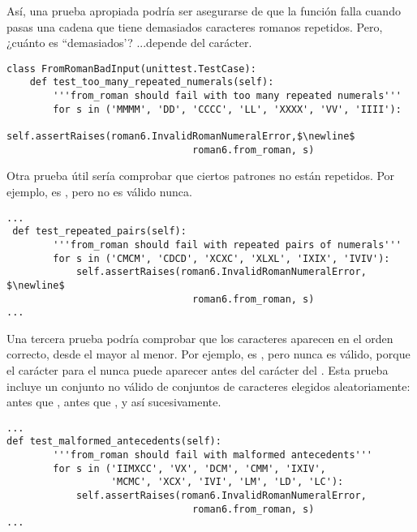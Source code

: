 Así, una prueba apropiada podría ser asegurarse de que la función  falla cuando pasas una cadena que tiene demasiados caracteres romanos repetidos. Pero, ¿cuánto es ``demasiados'? ...depende del carácter.

\noindent\begin{minipage}{\textwidth}
\begin{lstlisting}[mathescape=True]
class FromRomanBadInput(unittest.TestCase):
    def test_too_many_repeated_numerals(self):
        '''from_roman should fail with too many repeated numerals'''
        for s in ('MMMM', 'DD', 'CCCC', 'LL', 'XXXX', 'VV', 'IIII'):
            self.assertRaises(roman6.InvalidRomanNumeralError,$\newline$ 
                                roman6.from_roman, s)
\end{lstlisting}
\end{minipage}

Otra prueba útil sería comprobar que ciertos patrones no están repetidos. Por ejemplo,  es , pero  no es válido nunca.

\noindent\begin{minipage}{\textwidth}
\begin{lstlisting}[mathescape=True]
...
 def test_repeated_pairs(self):
        '''from_roman should fail with repeated pairs of numerals'''
        for s in ('CMCM', 'CDCD', 'XCXC', 'XLXL', 'IXIX', 'IVIV'):
            self.assertRaises(roman6.InvalidRomanNumeralError, $\newline$
                                roman6.from_roman, s)
...
\end{lstlisting}
\end{minipage}

Una tercera prueba podría comprobar que los caracteres aparecen en el orden correcto, desde el mayor al menor. Por ejemplo,  es , pero  nunca es válido, porque el carácter para el  nunca puede aparecer antes del carácter del . Esta prueba incluye un conjunto no válido de conjuntos de caracteres elegidos aleatoriamente:  antes que ,  antes que , y así sucesivamente.

\noindent\begin{minipage}{\textwidth}
\begin{lstlisting}[mathescape=True]
...
def test_malformed_antecedents(self):
        '''from_roman should fail with malformed antecedents'''
        for s in ('IIMXCC', 'VX', 'DCM', 'CMM', 'IXIV',
                  'MCMC', 'XCX', 'IVI', 'LM', 'LD', 'LC'):
            self.assertRaises(roman6.InvalidRomanNumeralError, 
                                roman6.from_roman, s)
...
\end{lstlisting}
\end{minipage}

